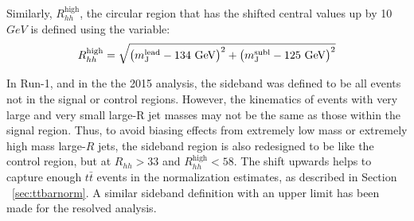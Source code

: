 Similarly, $R_{hh}^{\text{high}}$, the circular region that has the shifted central values up by 10 $GeV$ is defined using the variable:\begin{equation}
\label{eq:boosted_RhhhighDef}
R_{hh}^{\text{high}} = \sqrt{\left(m^{\rm lead}_{\rm J} - \text{134 GeV}\right)^2 + \left(m^{\rm subl}_{\rm J} - \text{125 GeV}\right)^2}
\end{equation}

In Run-1, and in the the 2015 analysis, the sideband was defined to be all events not in the signal or control regions. However, the kinematics of events with very large and very small large-R jet masses may not be the same as those within the signal region. Thus, to avoid biasing effects from extremely low mass or extremely high mass large-$R$ jets, the sideband region is also redesigned to be like the control region, but at $R_{hh} > 33$ and $R_{hh}^{\text{high}} < 58$. The shift upwards helps to capture enough $t\bar{t}$ events in the normalization estimates, as described in Section ~\ref{sec:ttbarnorm}. A similar sideband definition with an upper limit has been made for the resolved analysis.

